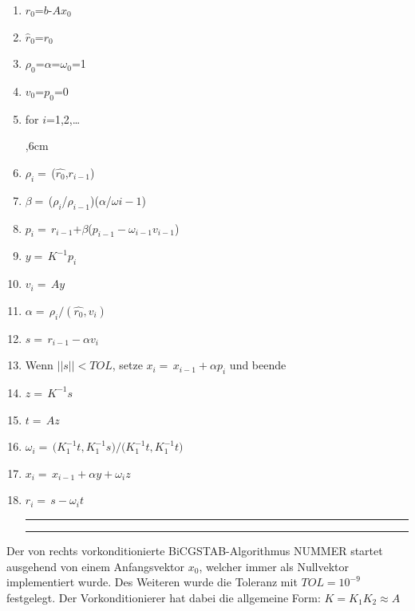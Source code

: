 \begin{enumerate}
	\setlength{\itemsep}{-6pt}
\hrule\hrule
	
	
	\item $r_0$=$b$-$A$$x_0$
	\item $\hat{r}_0$=$r_0$
	\item $\rho_0$=$\alpha$=$\omega_0$=1
	\item $v_0$=$p_0$=0
	\item for $i$=1,2,\dots
	\par
	\begingroup
	,6cm 
	\noindent 
	\item$\rho_i=$\,($\hat{r_0}$,$r_{i-1}$)
	\item$\beta=$\,($\rho_i$/$\rho_{i-1}$)($\alpha$/$\omega{i-1}$)
	\item$p_i=$\,$r_{i-1}$+$\beta$($p_{i-1}-\omega_{i-1}v_{i-1}$)	
	\item$y=$\,$K^{-1}p_i$
	\item$v_i=$\,$Ay$
	\item$\alpha=$\,$\rho_i/(\hat{r_0},v_i)$
	\item$s=$\,$r_{i-1}-\alpha$$v_i$
	\item Wenn $||s|| < TOL$, setze $x_i=$\,$x_{i-1}+\alpha$$p_i$ und beende 
	\item$z=$\,$K^{-1}s$
	\item$t=$\,$Az$
	\item$\omega_i=$\,$(K^{-1}_1$$t,K^{-1}_1$$s)/(K^{-1}_1$$t,K^{-1}_1$$t)$ 
	\item$x_i=$\,$x_{i-1}+\alpha$$y+\omega_i$$z$
	\item$r_i=$\,$s-\omega_i$$t$\\
	
	\hrule\hrule
	\par
	\endgroup 
	
\end{enumerate}



Der von rechts vorkonditionierte BiCGSTAB-Algorithmus NUMMER startet ausgehend von einem Anfangsvektor $x_0$, welcher immer als Nullvektor implementiert wurde. Des Weiteren wurde die Toleranz mit $TOL= 10^{-9}$ festgelegt. Der Vorkonditionierer hat dabei die allgemeine Form: 
$K = K_1 K_2 \approx A $
